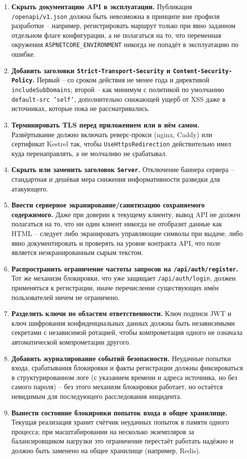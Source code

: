 \begin{enumerate}
  \item \textbf{Скрыть документацию API в эксплуатации.} Публикация
  \texttt{/openapi/v1.json} должна быть невозможна в принципе вне
  профиля разработки -- например, регистрировать маршрут только при явно
  заданном отдельном флаге конфигурации, а не полагаться на то, что
  переменная окружения \texttt{ASPNETCORE\_ENVIRONMENT} никогда не
  попадёт в эксплуатацию по ошибке.
  \item \textbf{Добавить заголовки \texttt{Strict-Transport-Security} и
  \texttt{Content-Security-Policy}.} Первый -- со сроком действия не
  менее года и директивой \texttt{includeSubDomains}; второй -- как
  минимум с политикой по умолчанию \texttt{default-src 'self'},
  дополнительно снижающей ущерб от XSS даже в источниках, которые пока
  не рассматривались.
  \item \textbf{Терминировать TLS перед приложением или в нём самом.}
  Развёртывание должно включать реверс-прокси (nginx, Caddy) или
  сертификат Kestrel так, чтобы \texttt{UseHttpsRedirection} действительно
  имел куда перенаправлять, а не молчаливо не срабатывал.
  \item \textbf{Скрыть или заменить заголовок \texttt{Server}.} Отключение
  баннера сервера -- стандартная и дешёвая мера снижения
  информативности разведки для атакующего.
  \item \textbf{Ввести серверное экранирование/санитизацию сохраняемого
  содержимого.} Даже при доверии к текущему клиенту, вывод API не должен
  полагаться на то, что ни один клиент никогда не отобразит данные как
  HTML -- следует либо экранировать управляющие символы при выдаче, либо
  явно документировать и проверять на уровне контракта API, что поле
  является неэкранированным сырым текстом.
  \item \textbf{Распространить ограничение частоты запросов на
  \texttt{/api/auth/register}.} Тот же механизм блокировки, что уже
  защищает \texttt{/api/auth/login}, должен применяться к регистрации,
  иначе перечисление существующих имён пользователей ничем не
  ограничено.
  \item \textbf{Разделить ключи по областям ответственности.} Ключ
  подписи JWT и ключ шифрования конфиденциальных данных должны быть
  независимыми секретами с независимой ротацией, чтобы компрометация
  одного не означала автоматической компрометации другого.
  \item \textbf{Добавить журналирование событий безопасности.} Неудачные
  попытки входа, срабатывания блокировки и факты регистрации должны
  фиксироваться в структурированном логе (с указанием времени и адреса
  источника, но без самого пароля) -- без этого механизм блокировки
  работает, но остаётся невидимым для последующего расследования
  инцидента.
  \item \textbf{Вынести состояние блокировки попыток входа в общее
  хранилище.} Текущая реализация хранит счётчик неудачных попыток в
  памяти одного процесса; при масштабировании на несколько экземпляров
  за балансировщиком нагрузки это ограничение перестаёт работать
  надёжно и должно быть заменено на общее хранилище (например, Redis).
\end{enumerate}

